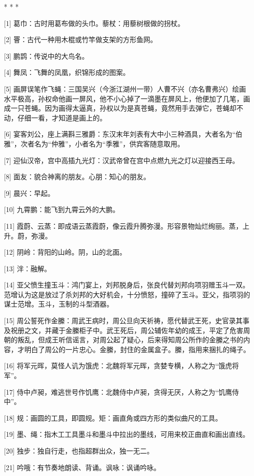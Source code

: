 \documentclass[12pt,UTF8]{ctexbook}
\begin{document}
* * *



[1] 葛巾：古时用葛布做的头巾。藜杖：用藜树根做的拐杖。

[2] 罾：古代一种用木棍或竹竿做支架的方形鱼网。

[3] 鹏鹍：传说中的大鸟名。

[4] 舞凤：飞舞的凤凰，织锦形成的图案。

[5] 画屏误笔作飞蝇：三国吴兴（今浙江湖州一带）人曹不兴（亦名曹弗兴）绘画水平极高，孙权命他画一屏风，他不小心掉了一滴墨在屏风上，他便加了几笔，画成一只苍蝇。因为画得太逼真，孙权以为是真苍蝇，竟然用手去弹它，苍蝇却不动，仔细一看，才知道是画上的。

[6] 宴客刘公，座上满斟三雅爵：东汉末年刘表有大中小三种酒具，大者名为“伯雅”，次者名为“仲雅”，小者名为“季雅”，供宾客随意取用。

[7] 迎仙汉帝，宫中高插九光灯：汉武帝曾在宫中点燃九光之灯以迎接西王母。

[8] 面友：貌合神离的朋友。心朋：知心的朋友。

[9] 晨兴：早起。

[10] 九霄鹏：能飞到九霄云外的大鹏。

[11] 霞蔚、云蒸：即成语云蒸霞蔚，像云霞升腾弥漫。形容景物灿烂绚丽。蒸，上升。蔚，弥漫。

[12] 阴岭：背阳的山岭。阴，山的北面。

[13] 泮：融解。

[14] 亚父愤生撞玉斗：鸿门宴上，刘邦脱身后，张良代替刘邦向项羽赠玉斗一双。范增认为这是放过了杀刘邦的大好机会，十分愤怒，撞碎了玉斗。亚父，指项羽的谋士范增。玉斗，玉制的斗型酒器。

[15] 周公誓死作金縢：周武王病时，周公旦向天祈祷，愿代替武王死，史官录其事及祝册之文，并藏于金縢柜子中。武王死后，周公辅佐年幼的成王，平定了危害周朝的叛乱，但成王听信谣言，对周公起了疑心，后来得知周公所作的金縢之书的内容，才明白了周公的一片忠心。金縢，封住的金属盒子。縢，指用来捆扎的绳子。

[16] 将军元晖，莫怪人讥为饿虎：北魏将军元晖，贪婪专横，人称之为“饿虎将军”。

[17] 侍中卢昶，难逃世号作饥鹰：北魏侍中卢昶，贪得无厌，人称之为“饥鹰侍中”。

[18] 规：画圆的工具，即圆规。矩：画直角或四方形的类似曲尺的工具。

[19] 墨、绳：指木工工具墨斗和墨斗中拉出的墨线，可用来校正曲直和画出直线。

[20] 独步：独自行走，也指超群出众，独一无二。

[21] 吟哦：有节奏地朗读、背诵。讽咏：讽诵吟咏。
\end{document}
